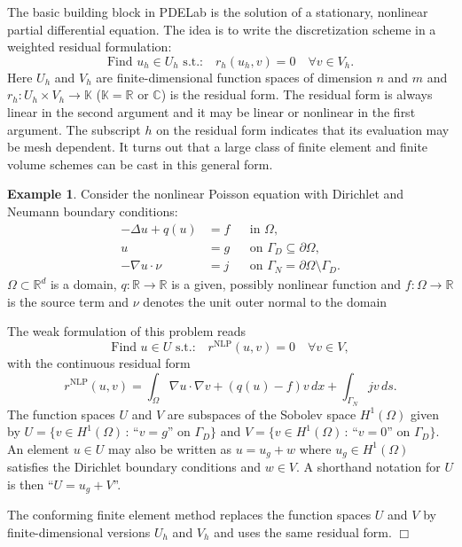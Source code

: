 \documentclass[a4paper,12pt]{article}
\theoremstyle{definition}
\newtheorem{exm}{Example}
\begin{document}
The basic building block in PDELab is the solution of
a stationary, nonlinear partial differential equation.
The idea is to write the discretization scheme in a weighted residual formulation:
\begin{equation}
\text{Find $u_h\in U_h$ s.t.:} \quad r_h(u_h,v)=0 \quad \forall v\in V_h.
\label{Eq:BasicBuildingBlock}
\end{equation}
Here $U_h$ and $V_h$ are finite-dimensional function spaces of dimension $n$ and $m$
and $r_h: U_h\times V_h\to\mathbb{K}$ ($\mathbb{K}=\mathbb{R}$ or
$\mathbb{C}$) is the residual form. The residual
form is always linear in the second argument and it may be linear or nonlinear in the first
argument. The subscript $h$ on the residual form indicates that its evaluation may be mesh dependent.
It turns out that a large class of finite element and finite volume schemes
can be cast in this general form.

\begin{exm} \label{Exm:NonlinearPoisson}
Consider the nonlinear Poisson equation with
Dirichlet and Neumann boundary conditions:
\begin{align*}
-\Delta u + q(u) &= f &&\text{in $\Omega$},\\
u &= g &&\text{on $\Gamma_D\subseteq\partial\Omega$},\\
-\nabla u\cdot \nu &= j &&\text{on $\Gamma_N=\partial\Omega\setminus\Gamma_D$}.
\end{align*}
$\Omega\subset\mathbb{R}^d$ is a domain, $q:\mathbb{R}\to\mathbb{R}$ is a given, possibly
nonlinear function and $f: \Omega\to\mathbb{R}$ is the source term and
$\nu$ denotes the unit outer normal to the domain

The weak formulation of this problem reads
\begin{equation*}
\text{Find $u\in U$ s.t.:} \quad r^{\text{NLP}}(u,v)=0 \quad \forall v\in V,
\end{equation*}
with the continuous residual form
\begin{equation*}
r^{\text{NLP}}(u,v) = \int_\Omega \nabla u \cdot \nabla v + (q(u)-f)v\,dx + \int_{\Gamma_N} jv\,ds .
\end{equation*}
The function spaces $U$ and $V$ are subspaces of the Sobolev space $H^1(\Omega)$ given by
$U= \{v\in H^1(\Omega) \,:\, \text{``$v=g$'' on $\Gamma_D$}\}$
and $V= \{v\in H^1(\Omega) \,:\, \text{``$v=0$'' on $\Gamma_D$}\}$. An element $u\in U$ may
also be written as $u=u_g + w$ where $u_g\in H^1(\Omega)$ satisfies the Dirichlet boundary
conditions and $w\in V$. A shorthand notation for $U$ is then ``$U=u_g+V$''.

The conforming finite element method \cite{BrennerScott,Elman2005,Ern}
replaces the function spaces
$U$ and $V$ by finite-dimensional versions $U_h$ and $V_h$ and uses the same residual form.
\hfill$\Box$
\end{exm}
\end{document}
